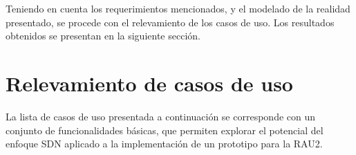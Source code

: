
Teniendo en cuenta los requerimientos mencionados, y el modelado de la realidad presentado, se procede con el relevamiento de los casos de uso. Los resultados obtenidos se presentan en la siguiente secci\'on.

\section[Relevamiento de casos de uso]{Relevamiento de casos de uso}
\label{section5.3}

La lista de casos de uso presentada a continuaci\'on se corresponde con un conjunto de funcionalidades b\'asicas, que permiten explorar el potencial del enfoque SDN aplicado a la implementaci\'on de un prototipo para la RAU2.\\ 


